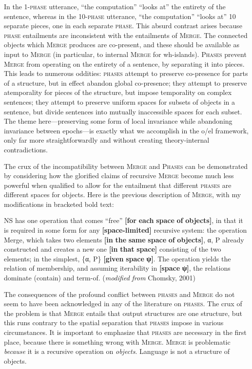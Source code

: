   In the 1-\textsc{phase} utterance, “the computation” “looks at” the entirety of the sentence, whereas in the 10-\textsc{phase} utterance, “the computation” “looks at” 10 separate pieces, one in each separate \textsc{phase}. This absurd contrast arises because \textsc{phase} entailments are inconsistent with the entailments of \textsc{Merge}. The connected objects which \textsc{Merge} produces are co-present, and these should be available as input to \textsc{Merge} (in particular, to internal \textsc{Merge} for wh-islands). \textsc{Phases} prevent \textsc{Merge} from operating on the entirety of a sentence, by separating it into pieces. This leads to numerous oddities: \textsc{phases} attempt to preserve co-presence for parts of a structure, but in effect abandon global co-presence; they attempt to preserve atemporality for pieces of the structure, but impose temporality on complex sentences; they attempt to preserve uniform spaces for subsets of objects in a sentence, but divide sentences into mutually inaccessible spaces for each subset. The theme here—preserving some form of local invariance while abandoning invariance between epochs—is exactly what we accomplish in the o/el framework, only far more straightforwardly and without creating theory-internal contradictions. 

  The crux of the incompatibility between \textsc{Merge} and \textsc{Phases} can be demonstrated by considering how the glorified claims of recursive \textsc{Merge} become much less powerful when qualified to allow for the entailment that different \textsc{phases} are different spaces for objects. Here is the previous description of \textsc{Merge}, with my modifications in bracketed bold text:

NS has one operation that comes “free” \textbf{[for} \textbf{each} \textbf{space} \textbf{of} \textbf{objects]}, in that it is required in some form for any \textbf{[space-limited]} recursive system: the operation Merge, which takes two elements \textbf{[in} \textbf{the} \textbf{same} \textbf{space} \textbf{of} \textbf{objects]}, α, P already constructed and creates a new one \textbf{[in} \textbf{that} \textbf{space]} consisting of the two elements; in the simplest, \{α, P\} \textbf{[given} \textbf{space} \textbf{ψ]}. The operation yields the relation of membership, and assuming iterability in \textbf{[space} \textbf{ψ]}, the relations dominate (contain) and term-of. (\textit{modified} \textit{from} Chomsky, 2001)

  The consequences of the profound conflict between \textsc{phases} and \textsc{Merge} do not seem to have been acknowledged in any of the literature on \textsc{phases}. The crux of the problem is that \textsc{Merge} entails that output structures are one structure, but this runs contrary to the spatial separation that \textsc{phases} impose in various circumstances. It is important to emphasize that \textsc{phases} are necessary in the first place, because there is something wrong with \textsc{Merge}. \textsc{Merge} is problematic \textit{because} it is a recursive operation on \textit{objects}. Language is not a structure of objects.

